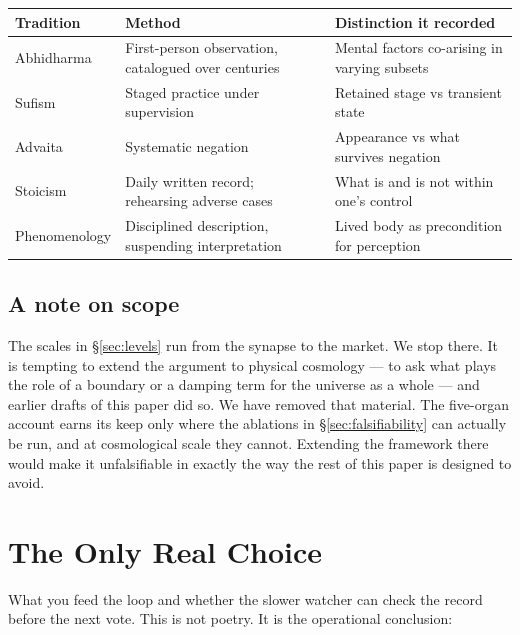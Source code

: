 \documentclass[11pt]{article}
\begin{document}
{\begin{center}
\setlength{\tabcolsep}{3pt}
\small
\begin{tabular}{P{2.4cm}P{3.4cm}P{5.6cm}}
\toprule
Tradition & Method & Distinction it recorded \\
\midrule
Abhidharma & First-person observation, catalogued over centuries & Mental factors co-arising in varying subsets \\
Sufism & Staged practice under supervision & Retained stage vs transient state \\
Advaita & Systematic negation & Appearance vs what survives negation \\
Stoicism & Daily written record; rehearsing adverse cases & What is and is not within one's control \\
Phenomenology & Disciplined description, suspending interpretation & Lived body as precondition for perception \\
\bottomrule
\end{tabular}
\end{center}

\subsection{A note on scope}
\label{sec:universe}

The scales in \S\ref{sec:levels} run from the synapse to the market. We stop
there. It is tempting to extend the argument to physical cosmology --- to ask
what plays the role of a boundary or a damping term for the universe as a
whole --- and earlier drafts of this paper did so. We have removed that
material. The five-organ account earns its keep only where the ablations in
\S\ref{sec:falsifiability} can actually be run, and at cosmological scale they
cannot. Extending the framework there would make it unfalsifiable in exactly
the way the rest of this paper is designed to avoid.

\section{The Only Real Choice}
\label{sec:choice}

What you feed the loop and whether the slower watcher can check the record before the next vote. This is not poetry. It is the operational conclusion:

}
\end{document}
